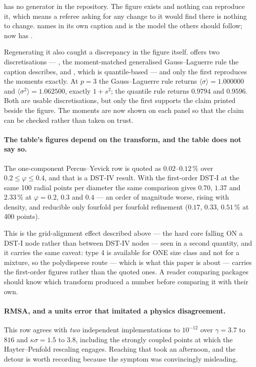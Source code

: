  has no generator in the repository. The figure
exists and nothing can reproduce it, which means a referee asking for any
change to it would find there is nothing to change.
 names  in its own
caption and is the model the others should follow;
 now has
.

Regenerating it also caught a discrepancy in the figure itself.
 offers two discretisations --- ,
the moment-matched generalised Gauss--Laguerre rule the caption describes,
and , which is quantile-based --- and only the first
reproduces the moments exactly. At $p = 3$ the Gauss--Laguerre rule returns
$\langle\sigma\rangle = 1.000000$ and $\langle\sigma^{2}\rangle = 1.062500$,
exactly $1 + s^{2}$; the quantile rule returns $0.9794$ and $0.9596$. Both
are usable discretisations, but only the first supports the claim printed
beside the figure. The moments are now shown on each panel so that the claim
can be checked rather than taken on trust.

\paragraph{The table's figures depend on the transform, and the table does
not say so.} The one-component Percus--Yevick row is quoted as
$0.02$--$0.12\,\%$ over $0.2 \le \varphi \le 0.4$, and that is a DST-IV
result. With the first-order DST-I at the same 100 radial points per
diameter the same comparison gives $0.70$, $1.37$ and $2.33\,\%$ at
$\varphi = 0.2$, $0.3$ and $0.4$ --- an order of magnitude worse, rising with
density, and reducible only fourfold per fourfold refinement
($0.17$, $0.33$, $0.51\,\%$ at 400 points).

This is the grid-alignment effect described above --- the hard core falling ON
a DST-I node rather than between DST-IV nodes --- seen in a second
quantity, and it carries the same caveat: type 4 is available for ONE size
class and not for a mixture, so the polydisperse route --- which is what this
paper is about --- carries the first-order figures rather than the quoted
ones. A reader comparing packages should know which transform produced a
number before comparing it with their own.

\paragraph{RMSA, and a units error that imitated a physics disagreement.}
\label{sec:rmsarescale}
This row agrees with \emph{two} independent implementations to $10^{-12}$
over $\gamma = 3.7$ to $816$ and $\kappa\sigma = 1.5$ to $3.8$, including the
strongly coupled points at which the Hayter--Penfold rescaling engages.
Reaching that took an afternoon, and the detour is worth recording because
the symptom was convincingly misleading.

